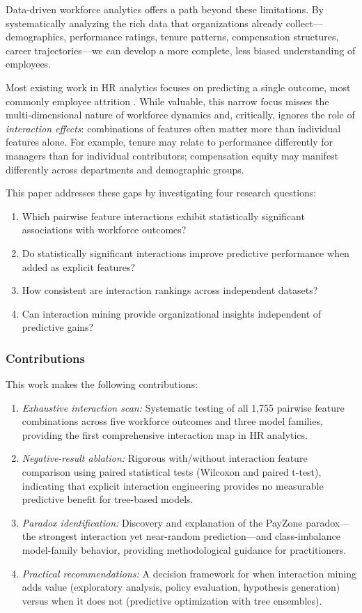 \documentclass[conference]{IEEEtran}
\begin{document}
Data-driven workforce analytics offers a path beyond these limitations. By systematically analyzing the rich data that organizations already collect---demographics, performance ratings, tenure patterns, compensation structures, career trajectories---we can develop a more complete, less biased understanding of employees.

Most existing work in HR analytics focuses on predicting a single outcome, most commonly employee attrition \cite{talebi2025systematic}. While valuable, this narrow focus misses the multi-dimensional nature of workforce dynamics and, critically, ignores the role of \textit{interaction effects}: combinations of features often matter more than individual features alone. For example, tenure may relate to performance differently for managers than for individual contributors; compensation equity may manifest differently across departments and demographic groups.

This paper addresses these gaps by investigating four research questions:

\begin{enumerate}
    \item[RQ1] Which pairwise feature interactions exhibit statistically significant associations with workforce outcomes?
    \item[RQ2] Do statistically significant interactions improve predictive performance when added as explicit features?
    \item[RQ3] How consistent are interaction rankings across independent datasets?
    \item[RQ4] Can interaction mining provide organizational insights independent of predictive gains?
\end{enumerate}

\subsubsection*{Contributions}
This work makes the following contributions:
\begin{enumerate}
    \item \textit{Exhaustive interaction scan:} Systematic testing of all 1,755 pairwise feature combinations across five workforce outcomes and three model families, providing the first comprehensive interaction map in HR analytics.
    \item \textit{Negative-result ablation:} Rigorous with/without interaction feature comparison using paired statistical tests (Wilcoxon and paired t-test), indicating that explicit interaction engineering provides no measurable predictive benefit for tree-based models.
    \item \textit{Paradox identification:} Discovery and explanation of the PayZone paradox---the strongest interaction yet near-random prediction---and class-imbalance model-family behavior, providing methodological guidance for practitioners.
    \item \textit{Practical recommendations:} A decision framework for when interaction mining adds value (exploratory analysis, policy evaluation, hypothesis generation) versus when it does not (predictive optimization with tree ensembles).
\end{enumerate}
\end{document}
